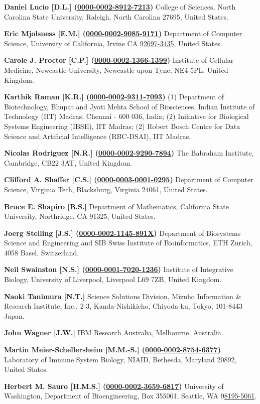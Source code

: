 \documentclass{sbml-paper}
\newcommand{\orcid}[1]{\href{https://orcid.org/#1}{#1}}
\begin{document}
\textbf{Daniel Lucio [D.L.] (\orcid{0000-0002-8912-7213})} College of Sciences, North Carolina State University, Raleigh, North Carolina 27695, United States.

\textbf{Eric Mjolsness [E.M.] (\orcid{0000-0002-9085-9171})} Department of Computer Science, University of California, Irvine CA 9\orcid{2697-3435}, United States.

\textbf{Carole J. Proctor [C.P.] (\orcid{0000-0002-1366-1399})} Institute of Cellular Medicine, Newcastle University, Newcastle upon Tyne, NE4 5PL, United Kingdom.

\textbf{Karthik Raman [K.R.] (\orcid{0000-0002-9311-7093})} (1) Department of Biotechnology, Bhupat and Jyoti Mehta School of Biosciences, Indian Institute of Technology (IIT) Madras, Chennai - 600 036, India; (2) Initiative for Biological Systems Engineering (IBSE), IIT Madras; (2) Robert Bosch Centre for Data Science and Artificial Intelligence (RBC-DSAI), IIT Madras.

\textbf{Nicolas Rodriguez [N.R.] (\orcid{0000-0002-9290-7894})} The Babraham Institute, Cambridge, CB22 3AT, United Kingdom.

\textbf{Clifford A. Shaffer [C.S.] (\orcid{0000-0003-0001-0295})} Department of Computer Science, Virginia Tech, Blacksburg, Virginia 24061, United States.

\textbf{Bruce E. Shapiro [B.S.]} Department of Mathematics, California State University, Northridge, CA 91325, United States.

\textbf{Joerg Stelling [J.S.] (\orcid{0000-0002-1145-891X})} Department of Biosystems Science and Engineering and SIB Swiss Institute of Bioinformatics, ETH Zurich, 4058 Basel, Switzerland.

\textbf{Neil Swainston [N.S.] (\orcid{0000-0001-7020-1236})} Institute of Integrative Biology, University of Liverpool, Liverpool L69 7ZB, United Kingdom.

\textbf{Naoki Tanimura [N.T.]} Science Solutions Division, Mizuho Information \& Research Institute, Inc., 2-3, Kanda-Nishikicho, Chiyoda-ku, Tokyo, 101-8443 Japan.

\textbf{John Wagner [J.W.]} IBM Research Australia, Melbourne, Australia.

\textbf{Martin Meier-Schellersheim [M.M.-S.] (\orcid{0000-0002-8754-6377})} Laboratory of Immune System Biology, NIAID, Bethesda, Maryland 20892, United States.

\textbf{Herbert M. Sauro [H.M.S.] (\orcid{0000-0002-3659-6817})} University of Washington, Department of Bioengineering, Box 355061, Seattle, WA 9\orcid{8195-5061}.
\end{document}
